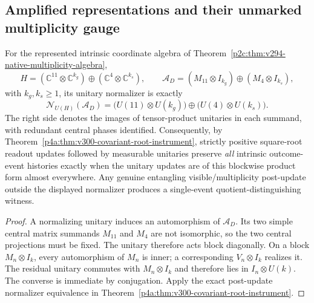 \documentclass[12pt,a4paper]{article}
\begin{document}
\subsection{Amplified representations and their unmarked multiplicity gauge}
\begin{proposition}
\label{p2c:prop:v300-coordinate-normalizer}
For the represented intrinsic coordinate algebra of
Theorem~\ref{p2c:thm:v294-native-multiplicity-algebra},
\[
 H=(\mathbb C^{11}\otimes\mathbb C^{k_g})\oplus
 (\mathbb C^4\otimes\mathbb C^{k_s}),\qquad
 \mathcal A_D=(M_{11}\otimes I_{k_g})\oplus(M_4\otimes I_{k_s}),
\]
with $k_g,k_s\ge1$, its unitary normalizer is exactly
\[
 \boxed{\mathcal N_{U(H)}(\mathcal A_D)=
 \bigl(U(11)\otimes U(k_g)\bigr)\oplus
 \bigl(U(4)\otimes U(k_s)\bigr).}
\]
The right side denotes the images of tensor-product unitaries in
each summand, with redundant central phases identified.
Consequently, by Theorem~\ref{p4a:thm:v300-covariant-root-instrument},
strictly positive square-root readout updates followed by measurable
unitaries preserve \emph{all} intrinsic outcome-event histories
exactly when the unitary updates are of this blockwise product form
almost everywhere. Any genuine entangling visible/multiplicity
post-update outside the displayed normalizer produces a single-event
quotient-distinguishing witness.
\end{proposition}
\begin{proof}
A normalizing unitary induces an automorphism of $\mathcal A_D$.
Its two simple central matrix summands $M_{11}$ and $M_4$ are not
isomorphic, so the two central projections must be fixed. The unitary
therefore acts block diagonally. On a block
$M_n\otimes I_k$, every automorphism of $M_n$ is inner;
a corresponding $V_n\otimes I_k$ realizes it. The residual unitary
commutes with $M_n\otimes I_k$ and therefore lies in
$I_n\otimes U(k)$. The converse is immediate by conjugation.
Apply the exact post-update normalizer equivalence in
Theorem~\ref{p4a:thm:v300-covariant-root-instrument}.
\end{proof}
\end{document}
